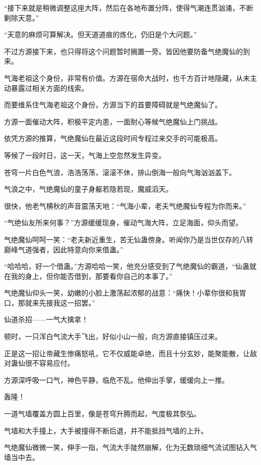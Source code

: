\begin{this_body}
“接下来就是稍微调整这座大阵，然后在各地布置分阵，使得气潮连贯汹涌，不断剿除天意。”

“天意的麻烦可算解决。但天道道痕的炼化，仍旧是个大问题。”

不过方源接下来，也只得将这个问题暂时搁置一旁。皆因他要防备气绝魔仙的到来。

气海老祖这个身份，非常有价值。方源在宿命大战时，也千方百计地隐藏，从未主动暴露过相关方面的线索。

而要维系住气海老祖这个身份，方源当下的首要障碍就是气绝魔仙了。

方源一面催动大阵，积极平定内患，一面耐心等候气绝魔仙上门挑战。

依凭方源的推算，气绝魔仙在最近这段时间专程过来交手的可能极高。

等候了一段时日，这一天，气海上空忽然发生异变。

苍穹一片白色气浪，浩浩荡荡，滚滚不休，排山倒海一般向气海汹汹盖下。

气浪之中，气绝魔仙的童子身躯若隐若现，魔威滔天。

很快，他老气横秋的声音震荡天地：“气海小辈，老夫气绝魔仙专程为你而来。”

“气绝仙友所来何事？”方源缓缓现身，催动气海大阵，立足海面，仰头而望。

气绝魔仙呵呵一笑：“老夫新近重生，苦无仙蛊傍身。听闻你乃是当世仅存的八转巅峰气道强者，因此特意向你来借蛊。”

“哈哈哈，好一个借蛊。”方源哈哈一笑，他充分感受到了气绝魔仙的霸道，“仙蛊就在我的身上，但你能否借到，那要看你自己的本事了。”

气绝魔仙仰头一笑，幼嫩的小脸上激荡起浓郁的战意：“痛快！小辈你很和我胃口，那就来先接我这一招罢。”

仙道杀招——一气大擒拿！

顿时，一只浑白气流大手飞出，好似小山一般，向方源直接镇压过来。

正是这一招让帝藏生惨痛怒吼，它不仅威能卓绝，而且十分玄妙，能聚能散，让敌对蛊仙很不容易应付。

方源深呼吸一口气，神色平静，临危不乱。他伸出手掌，缓缓向上一推。

轰隆！

一道气墙覆盖方圆上百里，像是苍穹升腾而起，气度极其恢弘。

气墙和大手撞上，大手被撞得不断后退，并不能抵挡气墙的上升。

气绝魔仙微微一笑，伸手一指，气流大手陡然崩解，化为无数琐细气流试图钻入气墙当中去。


\end{this_body}
